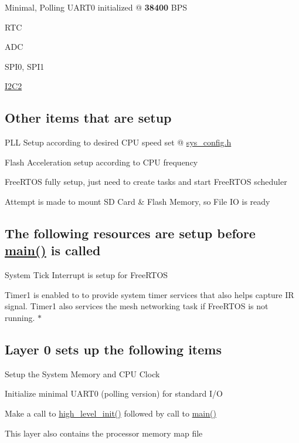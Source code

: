 
\begin{DoxyItemize}
\item Minimal, Polling U\+A\+R\+T0 initialized @ {\bfseries 38400} B\+PS
\item R\+TC
\item A\+DC
\item S\+P\+I0, S\+P\+I1
\item \hyperlink{classI2C2}{I2\+C2}
\end{DoxyItemize}

\subsection*{Other items that are setup}


\begin{DoxyItemize}
\item P\+LL Setup according to desired C\+PU speed set @ \hyperlink{sys__config_8h}{sys\+\_\+config.\+h}
\item Flash Acceleration setup according to C\+PU frequency
\item Free\+R\+T\+OS fully setup, just need to create tasks and start Free\+R\+T\+OS scheduler
\item Attempt is made to mount SD Card \& Flash Memory, so File IO is ready
\end{DoxyItemize}

\subsection*{The following resources are setup before \hyperlink{startup_8cpp_ae66f6b31b5ad750f1fe042a706a4e3d4}{main()} is called}


\begin{DoxyItemize}
\item System Tick Interrupt is setup for Free\+R\+T\+OS
\item Timer1 is enabled to to provide system timer services that also helps capture IR signal. Timer1 also services the mesh networking task if Free\+R\+T\+OS is not running. $\ast$
\end{DoxyItemize}

\subsection*{Layer 0 sets up the following items}


\begin{DoxyItemize}
\item Setup the System Memory and C\+PU Clock
\item Initialize minimal U\+A\+R\+T0 (polling version) for standard I/O
\item Make a call to \hyperlink{startup_8cpp_acad89fab6d9a3d739154bab04a6283c0}{high\+\_\+level\+\_\+init()} followed by call to \hyperlink{startup_8cpp_ae66f6b31b5ad750f1fe042a706a4e3d4}{main()}
\item This layer also contains the processor memory map file
\end{DoxyItemize}

